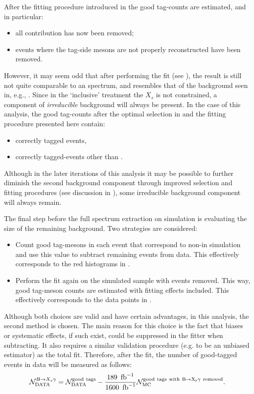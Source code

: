 After the fitting procedure introduced in  the good tag-\B counts are estimated, and in particular:
\begin{itemize}
    \item all \epem\ra\qqbar contribution has now been removed;
    \item events where the tag-side \B mesons are not properly reconstructed have been removed.
\end{itemize}

However, it may seem odd that after performing the \Mbc fit (see ), the result is still not quite comparable to an \EB spectrum,
and resembles that of the background seen in, e.g., .
Since in the `inclusive' treatment the $X_s$ is not constrained, a component of \textit{irreducible} background will always be present.
In the case of this analysis, the good tag-\B counts after the optimal selection in  and the fitting procedure presented here contain:
\begin{itemize}
    \item correctly tagged \BtoXsgamma events,
    \item correctly tagged-\BB events other than \BtoXsgamma.
\end{itemize}
Although in the later iterations of this analysis it may be possible to further diminish the second background component through improved selection and fitting procedures (see discussion in ), 
some irreducible background component will always remain.

The final step before the full \BtoXsgamma spectrum extraction on simulation is evaluating the size of the remaining \BB background.
Two strategies are considered:
\begin{itemize}
    \item Count good tag-\B mesons in each event that correspond to non-\BtoXsgamma in simulation and use this value to subtract remaining \BB events from data.
    This effectively corresponds to the red histograms in .
    \item Perform the fit again on the simulated sample with \BtoXsgamma events removed.
    This way, good tag-\B meson counts are estimated with fitting effects included.
    This effectively corresponds to the data points in .
\end{itemize}
Although both choices are valid and have certain advantages, in this analysis, the second method is chosen.
The main reason for this choice is the fact that biases or systematic effects, if such exist, could be suppressed in the fitter when subtracting.
It also requires a similar validation procedure (e.g. to be an unbiased estimator) as the total fit.
Therefore, after the \Mbc fit, the number of good-tagged \BtoXsgamma events in data will be measured as follows:
\begin{equation}\label{eq:background_subtraction}
    \mathcal{N}_{\mathrm{DATA}}^{\BtoXsgamma} = \mathcal{N}_{\mathrm{DATA}}^{\mathrm{good~tags}}  - \frac{189~\invfb}{1600~\invfb} \mathcal{N}_{\mathrm{MC}}^{\mathrm{good~tags~with~\BtoXsgamma~removed}}.
\end{equation}